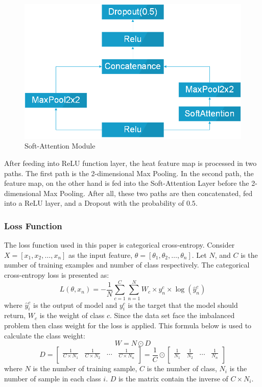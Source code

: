 \documentclass[sensors,article,submit,pdftex,moreauthors]{Definitions/mdpi}
\begin{document}
\begin{figure}[H]
	\centering
	\includegraphics[width=0.5\linewidth]{Definitions/SoftAttentionBlock}
	\caption{Soft-Attention Module}
	\label{fig:soft-attention-block}
\end{figure}

After feeding into ReLU function layer, the heat feature map is processed in two paths. The first path is the 2-dimensional Max Pooling. In the second path, the feature map, on the other hand is fed into the Soft-Attention Layer before the 2-dimensional Max Pooling. After all, these two paths are then concatenated, fed into a ReLU layer, and a Dropout with the probability of $0.5$.


\subsubsection{Loss Function}
The loss function used in this paper is categorical cross-entropy. Consider $X = [x_1, x_2, \dots, x_n]$ as the input feature, $\theta = [\theta_1, \theta_2, \dots, \theta_n]$. Let $N$, and $C$ is the number of training examples and number of class respectively. The categorical cross-entropy loss is presented as:
\[L(\theta, x_n) = -\frac{1}{N}\sum_{c=1}^{C}\sum_{n=1}^{N}W_c\times y^c_n \times \log(\hat{y}^c_n)\]
where $\hat{y}^c_i$  is the output of model and $y^c_i$ is the target that the model should return, $W_c$ is the weight of class $c$. Since the data set face the imbalanced problem then class weight for the loss is applied. This formula below is used to calculate the class weight:
\[W = N \odot D\]
\[D = \begin{bmatrix}
	\frac{1}{C \times  N_1} & \frac{1}{C \times  N_2} & \dots & \frac{1}{C \times  N_n}\\
\end{bmatrix} = \frac{1}{C} \odot \begin{bmatrix}
	\frac{1}{N_1} & \frac{1}{N_2} & \dots & \frac{1}{N_n}\\
\end{bmatrix}\]
where $N$ is the number of training sample, $C$ is the number of class, $N_i$ is the number of sample in each class $i$. $D$ is the matrix contain the inverse of $C \times N_i$. 
\end{document}
